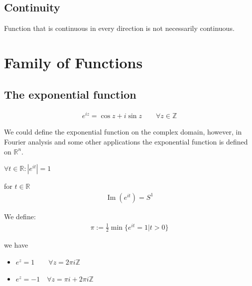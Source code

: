 \subsection{Continuity}
\begin{theorem}
	Function that is continuous in every direction is not necessarily continuous. 
\end{theorem}




\section{Family of Functions}
\subsection{The exponential function}
\begin{theorem}
	\begin{align*}
		e^{iz} = \cos z + i \sin z \qquad \forall z \in \mathbb{Z}
	\end{align*}
\end{theorem}
\begin{remark}
We could define the exponential function on the complex domain, however, in Fourier analysis and some other applications the exponential function is defined on $\mathbb{R}^n$.	
\end{remark}

\begin{lemma}
	$\forall t \in \mathbb{R}: |e^{it}|=1$
\end{lemma}

\begin{lemma}
for $t \in \mathbb{R}$
\begin{align*}
 \operatorname{Im}(e^{it}) = S^1
\end{align*}
\end{lemma}

\begin{definition}
	We define:
	\begin{align*}
		\pi := \frac{1}{2} \min \{ e^{it} = 1| t > 0\}
	\end{align*}
\end{definition}

\begin{proposition}
	we have
	\begin{itemize}
		\item $e^z = 1 \qquad \forall z = 2\pi i\mathbb{Z}$
		\item $e^z = -1 \quad \forall z = \pi i + 2\pi i \mathbb{Z}$
	\end{itemize}
\end{proposition}

